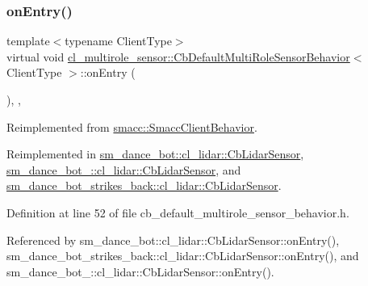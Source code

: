 \subsubsection{\texorpdfstring{on\+Entry()}{onEntry()}}
{\footnotesize\ttfamily template$<$typename Client\+Type$>$ \\
virtual void \hyperlink{classcl__multirole__sensor_1_1CbDefaultMultiRoleSensorBehavior}{cl\+\_\+multirole\+\_\+sensor\+::\+Cb\+Default\+Multi\+Role\+Sensor\+Behavior}$<$ Client\+Type $>$\+::on\+Entry (\begin{DoxyParamCaption}{ }\end{DoxyParamCaption})\hspace{0.3cm}{\ttfamily [inline]}, {\ttfamily [override]}, {\ttfamily [virtual]}}



Reimplemented from \hyperlink{classsmacc_1_1SmaccClientBehavior_ad5d3e1f1697c3cfe66c94cadba948493}{smacc\+::\+Smacc\+Client\+Behavior}.



Reimplemented in \hyperlink{structsm__dance__bot_1_1cl__lidar_1_1CbLidarSensor_aad3468a6ae78999c9fd01bdb81b42a49}{sm\+\_\+dance\+\_\+bot\+::cl\+\_\+lidar\+::\+Cb\+Lidar\+Sensor}, \hyperlink{structsm__dance__bot__2_1_1cl__lidar_1_1CbLidarSensor_aad4085c114dd98c5e857d1a71c0309f8}{sm\+\_\+dance\+\_\+bot\+\_\+::cl\+\_\+lidar\+::\+Cb\+Lidar\+Sensor}, and \hyperlink{structsm__dance__bot__strikes__back_1_1cl__lidar_1_1CbLidarSensor_a82d0250dcf2d4e9b12ccd528a5d87002}{sm\+\_\+dance\+\_\+bot\+\_\+strikes\+\_\+back\+::cl\+\_\+lidar\+::\+Cb\+Lidar\+Sensor}.



Definition at line 52 of file cb\+\_\+default\+\_\+multirole\+\_\+sensor\+\_\+behavior.\+h.



Referenced by sm\+\_\+dance\+\_\+bot\+::cl\+\_\+lidar\+::\+Cb\+Lidar\+Sensor\+::on\+Entry(), sm\+\_\+dance\+\_\+bot\+\_\+strikes\+\_\+back\+::cl\+\_\+lidar\+::\+Cb\+Lidar\+Sensor\+::on\+Entry(), and sm\+\_\+dance\+\_\+bot\+\_\+::cl\+\_\+lidar\+::\+Cb\+Lidar\+Sensor\+::on\+Entry().


